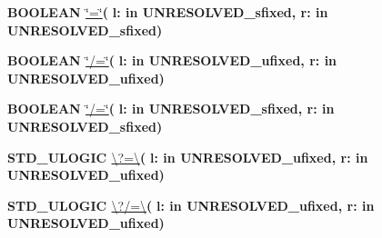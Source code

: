 \begin{DoxyCompactItemize}
{\bfseries {\bfseries \textcolor{comment}{B\+O\+O\+L\+E\+A\+N}\textcolor{vhdlchar}{ }}} \hyperlink{classfixed__pkg_a86c71a44ce23a245689eee9ff2db636a}{\char`\"{}=\char`\"{}}{\bfseries  ( }{\bfseries \textcolor{vhdlchar}{l\+: }\textcolor{stringliteral}{in }\textcolor{vhdlchar}{U\+N\+R\+E\+S\+O\+L\+V\+E\+D\+\_\+sfixed}}{\bfseries  , \textcolor{vhdlchar}{r\+: }\textcolor{stringliteral}{in }\textcolor{vhdlchar}{U\+N\+R\+E\+S\+O\+L\+V\+E\+D\+\_\+sfixed}}{\bfseries  )} 
\item 
{\bfseries {\bfseries \textcolor{comment}{B\+O\+O\+L\+E\+A\+N}\textcolor{vhdlchar}{ }}} \hyperlink{classfixed__pkg_a24c7f496c9f427dec65fd0b1ce9cd4bf}{\char`\"{}/=\char`\"{}}{\bfseries  ( }{\bfseries \textcolor{vhdlchar}{l\+: }\textcolor{stringliteral}{in }\textcolor{vhdlchar}{U\+N\+R\+E\+S\+O\+L\+V\+E\+D\+\_\+ufixed}}{\bfseries  , \textcolor{vhdlchar}{r\+: }\textcolor{stringliteral}{in }\textcolor{vhdlchar}{U\+N\+R\+E\+S\+O\+L\+V\+E\+D\+\_\+ufixed}}{\bfseries  )} 
\item 
{\bfseries {\bfseries \textcolor{comment}{B\+O\+O\+L\+E\+A\+N}\textcolor{vhdlchar}{ }}} \hyperlink{classfixed__pkg_a24c7f496c9f427dec65fd0b1ce9cd4bf}{\char`\"{}/=\char`\"{}}{\bfseries  ( }{\bfseries \textcolor{vhdlchar}{l\+: }\textcolor{stringliteral}{in }\textcolor{vhdlchar}{U\+N\+R\+E\+S\+O\+L\+V\+E\+D\+\_\+sfixed}}{\bfseries  , \textcolor{vhdlchar}{r\+: }\textcolor{stringliteral}{in }\textcolor{vhdlchar}{U\+N\+R\+E\+S\+O\+L\+V\+E\+D\+\_\+sfixed}}{\bfseries  )} 
\item 
{\bfseries {\bfseries \textcolor{comment}{S\+T\+D\+\_\+\+U\+L\+O\+G\+I\+C}\textcolor{vhdlchar}{ }}} \hyperlink{classfixed__pkg_a2d4857284cabcf55fd984b2bbe6e0e1b}{\textbackslash{}?=\textbackslash{}}{\bfseries  ( }{\bfseries \textcolor{vhdlchar}{l\+: }\textcolor{stringliteral}{in }\textcolor{vhdlchar}{U\+N\+R\+E\+S\+O\+L\+V\+E\+D\+\_\+ufixed}}{\bfseries  , \textcolor{vhdlchar}{r\+: }\textcolor{stringliteral}{in }\textcolor{vhdlchar}{U\+N\+R\+E\+S\+O\+L\+V\+E\+D\+\_\+ufixed}}{\bfseries  )} 
\item 
{\bfseries {\bfseries \textcolor{comment}{S\+T\+D\+\_\+\+U\+L\+O\+G\+I\+C}\textcolor{vhdlchar}{ }}} \hyperlink{classfixed__pkg_a6c6e2cca732277bb9db1679431f7a7ee}{\textbackslash{}?/=\textbackslash{}}{\bfseries  ( }{\bfseries \textcolor{vhdlchar}{l\+: }\textcolor{stringliteral}{in }\textcolor{vhdlchar}{U\+N\+R\+E\+S\+O\+L\+V\+E\+D\+\_\+ufixed}}{\bfseries  , \textcolor{vhdlchar}{r\+: }\textcolor{stringliteral}{in }\textcolor{vhdlchar}{U\+N\+R\+E\+S\+O\+L\+V\+E\+D\+\_\+ufixed}}{\bfseries  )} 
\item 

\end{DoxyCompactItemize}
